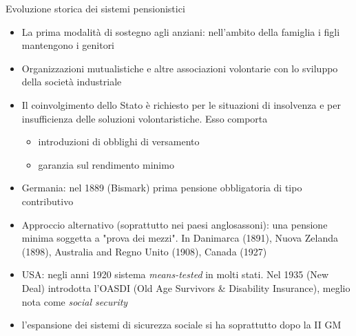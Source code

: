 \documentclass[aspectratio=64,11pt]{beamer}
\begin{document}
\begin{frame}{Evoluzione storica dei sistemi pensionistici}
\begin{itemize}
\item La prima modalità di sostegno agli anziani: nell'ambito della famiglia i
figli mantengono i genitori
\item Organizzazioni mutualistiche e altre associazioni volontarie con lo sviluppo
della società industriale
\item Il coinvolgimento dello Stato è richiesto per le situazioni di insolvenza e
per insufficienza delle soluzioni volontaristiche. Esso comporta
\begin{itemize}
\item introduzioni di obblighi di versamento
\item garanzia sul rendimento minimo
\end{itemize}
\item Germania: nel 1889 (Bismark) prima pensione obbligatoria di tipo
contributivo
\item Approccio alternativo (soprattutto nei paesi anglosassoni): una pensione
minima soggetta a "prova dei mezzi". In Danimarca (1891), Nuova Zelanda
(1898), Australia and Regno Unito (1908), Canada (1927)
\item USA: negli anni 1920 sistema \emph{means-tested} in molti stati. Nel 1935 (New
Deal) introdotta l'OASDI (Old Age Survivors \& Disability Insurance), meglio
nota come \emph{social security}
\item l'espansione dei sistemi di sicurezza sociale si ha soprattutto dopo la II
GM
\end{itemize}
\end{frame}
\end{document}
